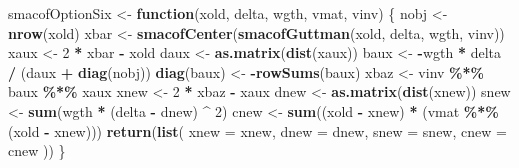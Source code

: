 \documentclass[
  12pt,
]{article}
\newenvironment{Shaded}{\begin{snugshade}}{\end{snugshade}}
\newcommand{\AttributeTok}[1]{\textcolor[rgb]{0.13,0.29,0.53}{#1}}
\newcommand{\ControlFlowTok}[1]{\textcolor[rgb]{0.13,0.29,0.53}{\textbf{#1}}}
\newcommand{\DecValTok}[1]{\textcolor[rgb]{0.00,0.00,0.81}{#1}}
\newcommand{\FunctionTok}[1]{\textcolor[rgb]{0.13,0.29,0.53}{\textbf{#1}}}
\newcommand{\NormalTok}[1]{#1}
\newcommand{\OtherTok}[1]{\textcolor[rgb]{0.56,0.35,0.01}{#1}}
\newcommand{\SpecialCharTok}[1]{\textcolor[rgb]{0.81,0.36,0.00}{\textbf{#1}}}
\begin{document}
\begin{Shaded}
\begin{Highlighting}[]
\NormalTok{smacofOptionSix }\OtherTok{\textless{}{-}} \ControlFlowTok{function}\NormalTok{(xold, delta, wgth, vmat, vinv) \{}
\NormalTok{  nobj }\OtherTok{\textless{}{-}} \FunctionTok{nrow}\NormalTok{(xold)}
\NormalTok{  xbar }\OtherTok{\textless{}{-}} \FunctionTok{smacofCenter}\NormalTok{(}\FunctionTok{smacofGuttman}\NormalTok{(xold, delta, wgth, vinv))}
\NormalTok{  xaux }\OtherTok{\textless{}{-}} \DecValTok{2} \SpecialCharTok{*}\NormalTok{ xbar }\SpecialCharTok{{-}}\NormalTok{ xold}
\NormalTok{  daux }\OtherTok{\textless{}{-}} \FunctionTok{as.matrix}\NormalTok{(}\FunctionTok{dist}\NormalTok{(xaux))}
\NormalTok{  baux }\OtherTok{\textless{}{-}} \SpecialCharTok{{-}}\NormalTok{wgth }\SpecialCharTok{*}\NormalTok{ delta }\SpecialCharTok{/}\NormalTok{ (daux }\SpecialCharTok{+} \FunctionTok{diag}\NormalTok{(nobj))}
  \FunctionTok{diag}\NormalTok{(baux) }\OtherTok{\textless{}{-}} \SpecialCharTok{{-}}\FunctionTok{rowSums}\NormalTok{(baux)}
\NormalTok{  xbaz }\OtherTok{\textless{}{-}}\NormalTok{ vinv }\SpecialCharTok{\%*\%}\NormalTok{ baux }\SpecialCharTok{\%*\%}\NormalTok{ xaux}
\NormalTok{  xnew }\OtherTok{\textless{}{-}} \DecValTok{2} \SpecialCharTok{*}\NormalTok{ xbaz }\SpecialCharTok{{-}}\NormalTok{ xaux}
\NormalTok{  dnew }\OtherTok{\textless{}{-}} \FunctionTok{as.matrix}\NormalTok{(}\FunctionTok{dist}\NormalTok{(xnew))}
\NormalTok{  snew }\OtherTok{\textless{}{-}} \FunctionTok{sum}\NormalTok{(wgth }\SpecialCharTok{*}\NormalTok{ (delta }\SpecialCharTok{{-}}\NormalTok{ dnew) }\SpecialCharTok{\^{}} \DecValTok{2}\NormalTok{)}
\NormalTok{  cnew }\OtherTok{\textless{}{-}} \FunctionTok{sum}\NormalTok{((xold }\SpecialCharTok{{-}}\NormalTok{ xnew) }\SpecialCharTok{*}\NormalTok{ (vmat }\SpecialCharTok{\%*\%}\NormalTok{ (xold }\SpecialCharTok{{-}}\NormalTok{ xnew)))}
  \FunctionTok{return}\NormalTok{(}\FunctionTok{list}\NormalTok{(}
    \AttributeTok{xnew =}\NormalTok{ xnew,}
    \AttributeTok{dnew =}\NormalTok{ dnew,}
    \AttributeTok{snew =}\NormalTok{ snew,}
    \AttributeTok{cnew =}\NormalTok{ cnew}
\NormalTok{  ))}
\NormalTok{\}}


\end{Highlighting}
\end{Shaded}
\end{document}
